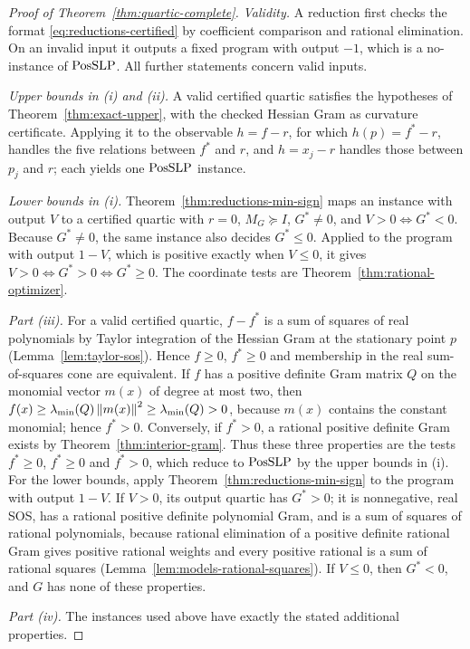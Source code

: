 \begin{proof}[Proof of Theorem~\ref{thm:quartic-complete}]
\emph{Validity.} A reduction first checks the format
\eqref{eq:reductions-certified} by coefficient comparison and rational
elimination. On an invalid input it outputs a fixed program with output
$-1$, which is a no-instance of $\mathrm{PosSLP}$. All further statements concern
valid inputs.

\emph{Upper bounds in (i) and (ii).} A valid certified quartic satisfies the
hypotheses of Theorem~\ref{thm:exact-upper}, with the checked Hessian Gram as
curvature certificate. Applying it to the observable $h=f-r$, for which
$h(p)=f^*-r$, handles the five relations between $f^*$ and $r$, and $h=x_j-r$
handles those between $p_j$ and $r$; each yields one $\mathrm{PosSLP}$ instance.

\emph{Lower bounds in (i).} Theorem~\ref{thm:reductions-min-sign} maps an
instance with output $V$ to a certified quartic with $r=0$, $M_G\succeq I$,
$G^*\ne0$, and $V>0\iff G^*<0$. Because $G^*\ne0$, the same instance also
decides $G^*\le0$. Applied to the program with output $1-V$, which is positive
exactly when $V\le0$, it gives $V>0\iff G^*>0\iff G^*\ge0$. The coordinate tests
are Theorem~\ref{thm:rational-optimizer}.

\emph{Part (iii).} For a valid certified quartic, $f-f^*$ is a sum of squares
of real polynomials by Taylor integration of the Hessian Gram at the
stationary point $p$ (Lemma~\ref{lem:taylor-sos}). Hence $f\ge0$, $f^*\ge0$ and
membership in the real sum-of-squares cone are equivalent. If $f$ has a
positive definite Gram matrix $Q$ on the monomial vector $m(x)$ of degree at
most two, then $f(x)\ge\lambda_{\min}(Q)\left\lVert m(x)\right\rVert^2\ge\lambda_{\min}(Q)>0$,
because $m(x)$ contains the constant monomial; hence $f^*>0$. Conversely, if
$f^*>0$, a rational positive definite Gram exists by
Theorem~\ref{thm:interior-gram}. Thus these three properties are the tests
$f^*\ge0$, $f^*\ge0$ and $f^*>0$, which reduce to $\mathrm{PosSLP}$ by the upper bounds
in (i). For the lower bounds, apply Theorem~\ref{thm:reductions-min-sign} to the
program with output $1-V$. If $V>0$, its output quartic has $G^*>0$; it is
nonnegative, real SOS, has a rational positive definite polynomial Gram, and is
a sum of squares of rational polynomials, because rational elimination of a
positive definite rational Gram gives positive rational weights and every
positive rational is a sum of rational squares
(Lemma~\ref{lem:models-rational-squares}). If $V\le0$, then $G^*<0$, and $G$ has
none of these properties.

\emph{Part (iv).} The instances used above have exactly the stated additional
properties.
\end{proof}

